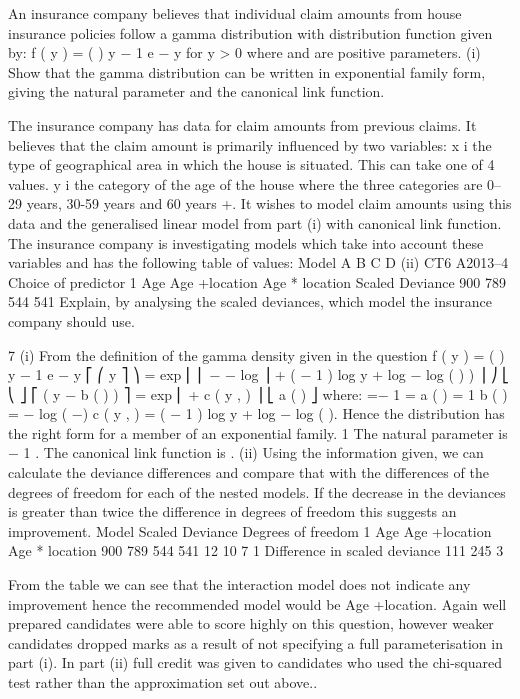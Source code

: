 \documentclass[a4paper,12pt]{article}
\begin{document}
An insurance company believes that individual claim amounts from house insurance
policies follow a gamma distribution with distribution function given by:
f ( y ) =
\alpha \alpha
\mu  \alpha \Gamma ( \alpha )
y
\alpha− 1
e
\alpha
− y
\mu 
for y > 0
where \alpha and \mu  are positive parameters.
(i)
Show that the gamma distribution can be written in exponential family form,
giving the natural parameter and the canonical link function.

The insurance company has data for claim amounts from previous claims. It believes
that the claim amount is primarily influenced by two variables:
x i the type of geographical area in which the house is situated. This can take
one of 4 values.
y i the category of the age of the house where the three categories are 0–29
years, 30-59 years and 60 years +.
It wishes to model claim amounts using this data and the generalised linear model
from part (i) with canonical link function. The insurance company is investigating
models which take into account these variables and has the following table of values:
Model
A
B
C
D
(ii)
CT6 A2013–4
Choice of
predictor
1
Age
Age +location
Age * location
Scaled Deviance
900
789
544
541
Explain, by analysing the scaled deviances, which model the insurance
company should use.

\newpage

7
(i)
From the definition of the gamma density given in the question
f ( y ) =
\alpha \alpha
\mu  \alpha \Gamma ( \alpha )
y
\alpha− 1
e
\alpha
− y
\mu 
⎡ ⎛ y
⎤
⎞
= exp ⎢ ⎜ − − log \mu  ⎟ \alpha + ( \alpha − 1 ) log y + \alpha log \alpha − log \Gamma ( \alpha ) ) ⎥
⎠
⎣ ⎝ \mu 
⎦
⎡ ( y \theta  − b ( \theta  ) )
⎤
= exp ⎢
+ c ( y , \phi  ) ⎥
⎣ a ( \phi  )
⎦
where:
\theta =−
1
\mu 
\phi =\alpha
a ( \phi  ) =
1
\phi 
b ( \theta  ) = − log ( −\theta  )
c ( y , \phi  ) = ( \phi  − 1 ) log y + \phi  log \phi  − log \Gamma ( \phi  ).
Hence the distribution has the right form for a member of an exponential
family.
1
The natural parameter is − 1 . The canonical link function is .
\mu 
\mu 
(ii)
Using the information given, we can calculate the deviance differences and
compare that with the differences of the degrees of freedom for each of the
nested models. If the decrease in the deviances is greater than twice the
difference in degrees of freedom this suggests an improvement.
Model Scaled
Deviance Degrees of
freedom
1
Age
Age +location
Age * location 900
789
544
541 12
10
7
1
Difference
in scaled
deviance
111
245
3

From the table we can see that the interaction model does not indicate any
improvement hence the recommended model would be Age +location.
Again well prepared candidates were able to score highly on this question, however weaker
candidates dropped marks as a result of not specifying a full parameterisation in part (i). In
part (ii) full credit was given to candidates who used the chi-squared test rather than the
approximation set out above..
\end{document}
